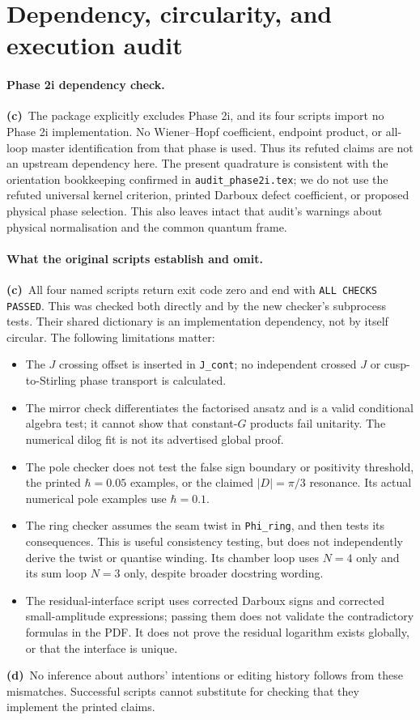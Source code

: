 \documentclass[11pt,a4paper]{article}
\newcommand{\Lc}{\textbf{(c)}\ }
\newcommand{\Ld}{\textbf{(d)}\ }
\begin{document}
\section{Dependency, circularity, and execution audit}
\paragraph{Phase 2i dependency check.}
\Lc The package explicitly excludes Phase 2i, and its four scripts import
no Phase 2i implementation. No Wiener--Hopf coefficient, endpoint product,
or all-loop master identification from that phase is used. Thus its refuted
claims are not an upstream dependency here. The present quadrature is
consistent with the orientation bookkeeping confirmed in
\texttt{audit\_phase2i.tex}; we do not use the refuted universal kernel
criterion, printed Darboux defect coefficient, or proposed physical phase
selection. This also leaves intact that audit's warnings about physical
normalisation and the common quantum frame.

\paragraph{What the original scripts establish and omit.}
\Lc All four named scripts return exit code zero and end with
\texttt{ALL CHECKS PASSED}. This was checked both directly and by the new
checker's subprocess tests. Their shared dictionary is an implementation
dependency, not by itself circular. The following limitations matter:
\begin{itemize}
\item The $J$ crossing offset is inserted in \texttt{J\_cont}; no independent
crossed $J$ or cusp-to-Stirling phase transport is calculated.
\item The mirror check differentiates the factorised ansatz and is a valid
conditional algebra test; it cannot show that constant-$G$ products fail
unitarity. The numerical dilog fit is not its advertised global proof.
\item The pole checker does not test the false sign boundary or positivity
threshold, the printed $\hbar=0.05$ examples, or the claimed $|D|=\pi/3$
resonance. Its actual numerical pole examples use $\hbar=0.1$.
\item The ring checker assumes the seam twist in \texttt{Phi\_ring}, and
then tests its consequences. This is useful consistency testing, but does
not independently derive the twist or quantise winding. Its chamber loop
uses $N=4$ only and its sum loop $N=3$ only, despite broader docstring wording.
\item The residual-interface script uses corrected Darboux signs and
corrected small-amplitude expressions; passing them does not validate the
contradictory formulas in the PDF. It does not prove the residual logarithm
exists globally, or that the interface is unique.
\end{itemize}
\Ld No inference about authors' intentions or editing history follows from
these mismatches. Successful scripts cannot substitute for checking that
they implement the printed claims.
\end{document}
